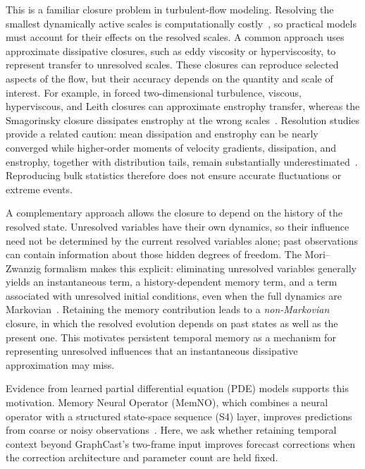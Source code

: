 \documentclass{article}
\begin{document}
{This is a familiar closure problem in turbulent-flow modeling. Resolving the smallest dynamically active scales is computationally costly~\citep{yang2021grid}, so practical models must account for their effects on the resolved scales. A common approach uses approximate dissipative closures, such as eddy viscosity or hyperviscosity, to represent transfer to unresolved scales. These closures can reproduce selected aspects of the flow, but their accuracy depends on the quantity and scale of interest. For example, in forced two-dimensional turbulence, viscous, hyperviscous, and Leith closures can approximate enstrophy transfer, whereas the Smagorinsky closure dissipates enstrophy at the wrong scales~\citep{pietarila2013closures}. Resolution studies provide a related caution: mean dissipation and enstrophy can be nearly converged while higher-order moments of velocity gradients, dissipation, and enstrophy, together with distribution tails, remain substantially underestimated~\citep{DonzisResolutionEffects}. Reproducing bulk statistics therefore does not ensure accurate fluctuations or extreme events.}

{A complementary approach allows the closure to depend on the history of the resolved state. Unresolved variables have their own dynamics, so their influence need not be determined by the current resolved variables alone; past observations can contain information about those hidden degrees of freedom. The Mori--Zwanzig formalism makes this explicit: eliminating unresolved variables generally yields an instantaneous term, a history-dependent memory term, and a term associated with unresolved initial conditions, even when the full dynamics are Markovian~\citep{YenTingLinMZ2021,de2026data}. Retaining the memory contribution leads to a \emph{non-Markovian} closure, in which the resolved evolution depends on past states as well as the present one. This motivates persistent temporal memory as a mechanism for representing unresolved influences that an instantaneous dissipative approximation may miss.}

{Evidence from learned partial differential equation (PDE) models supports this motivation. Memory Neural Operator (MemNO), which combines a neural operator with a structured state-space sequence (S4) layer, improves predictions from coarse or noisy observations~\citep{buitrago2025memory}. Here, we ask whether retaining temporal context beyond GraphCast's two-frame input improves forecast corrections when the correction architecture and parameter count are held fixed.}
\end{document}
